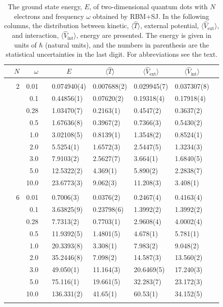\begin{table}[H]
	\caption{The ground state energy, $E$, of two-dimensional quantum dots with $N$ electrons and frequency $\omega$ obtained by RBM+SJ. In the following columns, the distribution between kinetic, $\langle\hat{T}\rangle$, external potential, $\langle\hat{V}_{\text{ext}}\rangle$, and interaction, $\langle\hat{V}_{\text{int}}\rangle$, energy are presented. The energy is given in units of $\hbar$ (natural units), and the numbers in parenthesis are the statistical uncertainties in the last digit. For abbreviations see the text.}
	\label{tab:splitfrequencyQDRBMSJ}
	\begin{tabularx}{\textwidth}{R{1cm}rrcR{2.3cm}R{2.3cm}R{2.3cm}R{2.3cm}R{1cm}} \hline\hline
		\makecell{\\ \phantom{$N$}} & $N$ & $\omega$ &&  &  &  &  & \\ \hline \\
		&2 & 0.01 && 0.074940(4) & 0.007688(2) & 0.029945(7) & 0.037307(8) \\
		&& 0.1 && 0.44856(1) & 0.07620(2) & 0.19318(4) & 0.17918(4) \\
		&& 0.28 && 1.03470(7) & 0.2163(1) & 0.4547(2) & 0.3637(2) \\
		&& 0.5 && 1.67636(8) & 0.3967(2) & 0.7366(3) & 0.5430(2)\\
		&& 1.0 && 3.02108(5) & 0.8139(1) & 1.3548(2) & 0.8524(1)\\
		&& 2.0 && 5.5254(1) & 1.6572(3) & 2.5447(5) & 1.3234(3) \\
		&& 3.0 && 7.9103(2) & 2.5627(7) & 3.664(1) & 1.6840(5) \\ 
		&& 5.0 && 12.5322(2) & 4.369(1) & 5.890(2) & 2.2838(7) \\
		&& 10.0 && 23.6773(3) & 9.062(3) & 11.208(3) & 3.408(1) \\
		\hline \\
		
		&6 & 0.01 && 0.7006(3) & 0.0376(2) & 0.2467(4) & 0.4163(4) \\
		&& 0.1 && 3.63825(9) & 0.23798(6) & 1.3992(2) & 1.3992(2) \\
		&& 0.28 && 7.7313(2) & 0.7703(1) & 2.9608(4) & 4.0002(4) \\
		&& 0.5 && 11.9392(5) & 1.4801(5) & 4.678(1) & 5.781(1) \\
		&& 1.0 && 20.3393(8) & 3.308(1) & 7.983(2) & 9.048(2) \\
		&& 2.0 && 35.2446(8) & 7.098(2) & 14.587(3) & 13.560(2) \\
		&& 3.0 && 49.050(1) & 11.164(3) & 20.6469(5) & 17.240(3) \\ 
		&& 5.0 && 75.116(1) & 19.661(5) & 32.283(7) & 23.172(3) \\
		&& 10.0 && 136.331(2) & 41.65(1) & 60.53(1) & 34.152(5) \\
		\hline \\
		

\end{tabularx}
\end{table}
